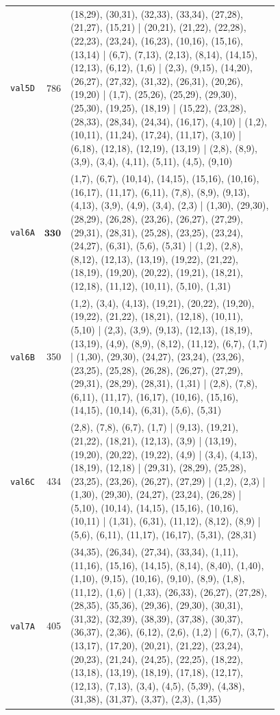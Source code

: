 \begin{landscape}
\begin{longtable}{lr>{\tiny\raggedright\arraybackslash}p{0.78\linewidth}}
\texttt{val5D} & 786 & (18,29), (30,31), (32,33), (33,34), (27,28), (21,27), (15,21) | (20,21), (21,22), (22,28), (22,23), (23,24), (16,23), (10,16), (15,16), (13,14) | (6,7), (7,13), (2,13), (8,14), (14,15), (12,13), (6,12), (1,6) | (2,3), (9,15), (14,20), (26,27), (27,32), (31,32), (26,31), (20,26), (19,20) | (1,7), (25,26), (25,29), (29,30), (25,30), (19,25), (18,19) | (15,22), (23,28), (28,33), (28,34), (24,34), (16,17), (4,10) | (1,2), (10,11), (11,24), (17,24), (11,17), (3,10) | (6,18), (12,18), (12,19), (13,19) | (2,8), (8,9), (3,9), (3,4), (4,11), (5,11), (4,5), (9,10) \\[2pt]
\texttt{val6A} & $\mathbf{330}$ & (1,7), (6,7), (10,14), (14,15), (15,16), (10,16), (16,17), (11,17), (6,11), (7,8), (8,9), (9,13), (4,13), (3,9), (4,9), (3,4), (2,3) | (1,30), (29,30), (28,29), (26,28), (23,26), (26,27), (27,29), (29,31), (28,31), (25,28), (23,25), (23,24), (24,27), (6,31), (5,6), (5,31) | (1,2), (2,8), (8,12), (12,13), (13,19), (19,22), (21,22), (18,19), (19,20), (20,22), (19,21), (18,21), (12,18), (11,12), (10,11), (5,10), (1,31) \\[2pt]
\texttt{val6B} & 350 & (1,2), (3,4), (4,13), (19,21), (20,22), (19,20), (19,22), (21,22), (18,21), (12,18), (10,11), (5,10) | (2,3), (3,9), (9,13), (12,13), (18,19), (13,19), (4,9), (8,9), (8,12), (11,12), (6,7), (1,7) | (1,30), (29,30), (24,27), (23,24), (23,26), (23,25), (25,28), (26,28), (26,27), (27,29), (29,31), (28,29), (28,31), (1,31) | (2,8), (7,8), (6,11), (11,17), (16,17), (10,16), (15,16), (14,15), (10,14), (6,31), (5,6), (5,31) \\[2pt]
\texttt{val6C} & 434 & (2,8), (7,8), (6,7), (1,7) | (9,13), (19,21), (21,22), (18,21), (12,13), (3,9) | (13,19), (19,20), (20,22), (19,22), (4,9) | (3,4), (4,13), (18,19), (12,18) | (29,31), (28,29), (25,28), (23,25), (23,26), (26,27), (27,29) | (1,2), (2,3) | (1,30), (29,30), (24,27), (23,24), (26,28) | (5,10), (10,14), (14,15), (15,16), (10,16), (10,11) | (1,31), (6,31), (11,12), (8,12), (8,9) | (5,6), (6,11), (11,17), (16,17), (5,31), (28,31) \\[2pt]
\texttt{val7A} & 405 & (34,35), (26,34), (27,34), (33,34), (1,11), (11,16), (15,16), (14,15), (8,14), (8,40), (1,40), (1,10), (9,15), (10,16), (9,10), (8,9), (1,8), (11,12), (1,6) | (1,33), (26,33), (26,27), (27,28), (28,35), (35,36), (29,36), (29,30), (30,31), (31,32), (32,39), (38,39), (37,38), (30,37), (36,37), (2,36), (6,12), (2,6), (1,2) | (6,7), (3,7), (13,17), (17,20), (20,21), (21,22), (23,24), (20,23), (21,24), (24,25), (22,25), (18,22), (13,18), (13,19), (18,19), (17,18), (12,17), (12,13), (7,13), (3,4), (4,5), (5,39), (4,38), (31,38), (31,37), (3,37), (2,3), (1,35) \\[2pt]

\end{longtable}
\end{landscape}
